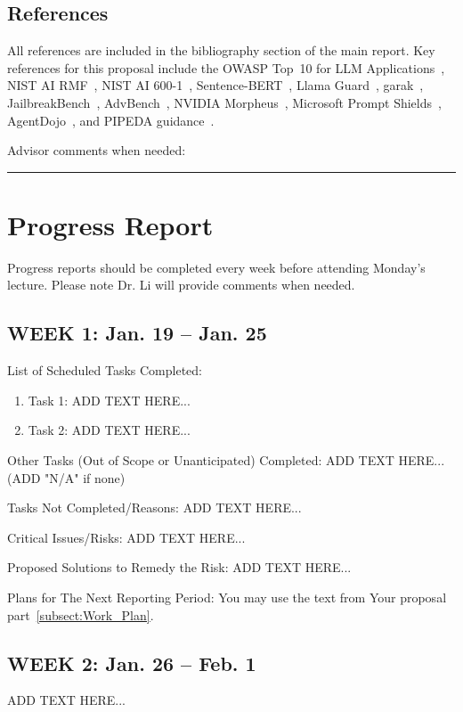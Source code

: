 \documentclass[journal,12pt,onecolumn,draftclsnofoot]{IEEEtran}
\begin{document}
\subsection{References}
All references are included in the bibliography section of the main report. Key references for this proposal include the OWASP Top~10 for LLM Applications~\cite{owasp_llm_2025}, NIST AI RMF~\cite{nist_ai_rmf}, NIST AI 600-1~\cite{nist_ai_600_1}, Sentence-BERT~\cite{sbert}, Llama Guard~\cite{llama_guard}, garak~\cite{garak_paper}, JailbreakBench~\cite{jailbreakbench}, AdvBench~\cite{advbench}, NVIDIA Morpheus~\cite{nvidia_morpheus}, Microsoft Prompt Shields~\cite{ms_prompt_shields}, AgentDojo~\cite{agentdojo}, and PIPEDA guidance~\cite{pipeda_guidance}.

Advisor comments when needed:

\noindent\rule{8cm}{0.5pt}


\section{Progress Report}
Progress reports should be completed every week before attending Monday's lecture. 
Please note Dr. Li will provide comments when needed.

\subsection*{WEEK 1: Jan. 19 -- Jan. 25}
\noindent
List of Scheduled Tasks Completed:
\begin{enumerate}
    \item Task 1: ADD TEXT HERE...
    \item Task 2: ADD TEXT HERE...
\end{enumerate}

Other Tasks (Out of Scope or Unanticipated) Completed:
ADD TEXT HERE... (ADD "N/A" if none)

Tasks Not Completed/Reasons:
ADD TEXT HERE...

Critical Issues/Risks:
ADD TEXT HERE...

Proposed Solutions to Remedy the Risk:
ADD TEXT HERE...

Plans for The Next Reporting Period:
You may use the text from Your proposal part~\ref{subsect:Work_Plan}.

% 
\subsection*{WEEK 2: Jan. 26 -- Feb. 1}
ADD TEXT HERE...
\end{document}
